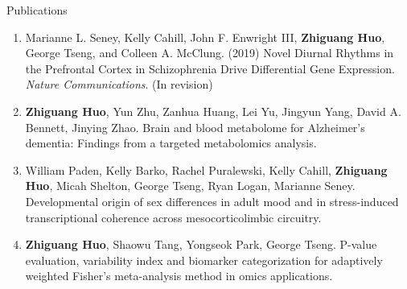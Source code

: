 \documentclass{resume} %
\begin{document}
\begin{rSection}{Publications}
\begin{enumerate}[noitemsep,topsep=0pt]
\item Marianne L. Seney, Kelly Cahill, John F. Enwright III, {\bf  Zhiguang Huo}, George Tseng, and Colleen A. McClung. (2019) Novel Diurnal Rhythms in the Prefrontal Cortex in Schizophrenia Drive Differential Gene Expression. \emph{Nature Communications}. (In revision) 


\item  {\bf Zhiguang Huo}, Yun Zhu, Zanhua Huang, Lei Yu, Jingyun Yang, David A. Bennett, Jinying Zhao. 
Brain and blood metabolome for Alzheimer's dementia: Findings from a targeted metabolomics analysis.

\item William Paden, Kelly Barko, Rachel Puralewski, Kelly Cahill, {\bf Zhiguang Huo}, Micah Shelton, George Tseng, Ryan Logan, Marianne Seney. 
Developmental origin of sex differences in adult mood and in stress-induced transcriptional coherence across mesocorticolimbic circuitry. 



\item  {\bf  Zhiguang Huo}, Shaowu Tang, Yongseok Park, George Tseng. 
P-value evaluation, variability index and biomarker categorization for adaptively weighted Fisher's meta-analysis method in omics applications. 

\end{enumerate}


\end{rSection}
\end{document}

